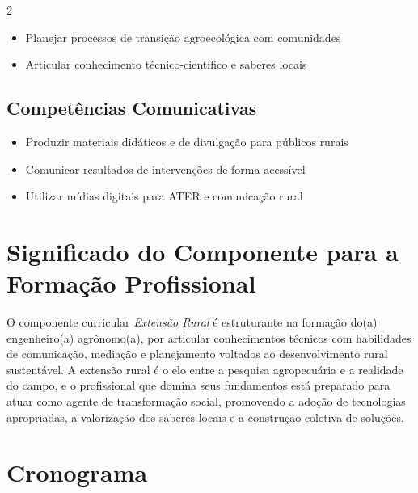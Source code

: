 \documentclass[11pt,a4paper]{article}
\begin{document}
\begin{multicols}{2}
\begin{itemize}
\item Planejar processos de transição agroecológica com comunidades

\item Articular conhecimento técnico-científico e saberes locais

\end{itemize}

\subsection*{Competências Comunicativas}

\begin{itemize}

\item Produzir materiais didáticos e de divulgação para públicos rurais

\item Comunicar resultados de intervenções de forma acessível

\item Utilizar mídias digitais para ATER e comunicação rural

\end{itemize}

\end{multicols}

\section*{Significado do Componente para a Formação Profissional}

O componente curricular \textit{Extensão Rural} é estruturante na formação do(a) engenheiro(a) agrônomo(a), por articular conhecimentos técnicos com habilidades de comunicação, mediação e planejamento voltados ao desenvolvimento rural sustentável. A extensão rural é o elo entre a pesquisa agropecuária e a realidade do campo, e o profissional que domina seus fundamentos está preparado para atuar como agente de transformação social, promovendo a adoção de tecnologias apropriadas, a valorização dos saberes locais e a construção coletiva de soluções.

\section*{Cronograma}
\end{document}
